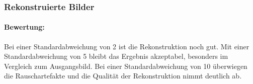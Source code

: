 \subsubsection{Rekonstruierte Bilder}

\paragraph{Bewertung:}
Bei einer Standardabweichung von 2 ist die Rekonstruktion noch gut. Mit einer Standardabweichung von 5 bleibt das Ergebnis akzeptabel, besonders im Vergleich zum Ausgangsbild. Bei einer Standardabweichung von 10 überwiegen die Rauschartefakte und die Qualität der Rekonstruktion nimmt deutlich ab.

\noindent
\begin{minipage}[t]{0.33\textwidth}
\end{minipage}
%
\begin{minipage}[t]{0.33\textwidth}
\end{minipage}
%
\begin{minipage}[t]{0.33\textwidth}
\end{minipage}